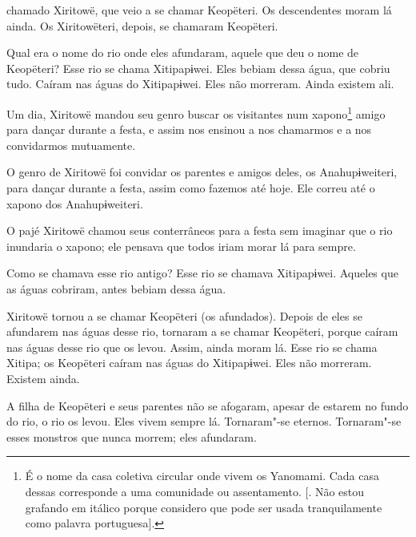 
 chamado Xiritowë, que veio a se chamar Keopëteri. Os
descendentes moram lá ainda. Os Xiritowëteri, depois, se chamaram
Keopëteri. 

Qual era o nome do rio onde eles afundaram, aquele que deu o nome de
Keopëteri? Esse rio se chama Xitipapɨwei. Eles bebiam dessa água, que
cobriu tudo. Caíram nas águas do Xitipapɨwei. Eles não morreram. Ainda
existem ali. 

Um dia, Xiritowë mandou seu genro buscar os visitantes
num xapono\footnote{  É o nome da casa coletiva circular onde vivem os Yanomami. Cada casa
dessas corresponde a uma comunidade ou assentamento. [. Não estou
grafando em itálico porque considero que pode ser usada tranquilamente
como palavra portuguesa].}  amigo para dançar durante a festa, e assim
nos ensinou a nos chamarmos e a nos convidarmos mutuamente. 

O genro de Xiritowë foi convidar os parentes e amigos deles, os
Anahupɨweiteri, para dançar durante a festa, assim como fazemos até hoje.
Ele correu até o xapono dos Anahupɨweiteri. 

O pajé Xiritowë chamou seus conterrâneos para a festa sem imaginar que o
rio inundaria o xapono; ele pensava que todos iriam morar lá para
sempre. 

Como se chamava esse rio {antigo}? Esse rio se chamava
Xitipapɨwei. Aqueles que as águas cobriram, antes bebiam dessa água. 

Xiritowë tornou a se chamar Keopëteri (os afundados). Depois de eles se
afundarem nas águas desse rio, tornaram a se chamar Keopëteri, porque
caíram nas águas desse rio que os levou. Assim, ainda moram lá. Esse rio
se chama Xitipa; os Keopëteri caíram nas águas do Xitipapɨwei. Eles não
morreram. Existem ainda. 

A filha de Keopëteri e seus parentes não se afogaram, apesar de estarem
no fundo do rio, o rio os levou. Eles vivem sempre lá. Tornaram"-se
eternos. Tornaram"-se esses monstros que nunca morrem; eles afundaram.

 

